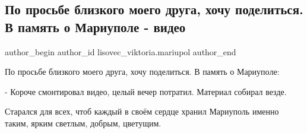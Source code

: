  
 
 
 
 

\subsection{По просьбе близкого моего друга, хочу поделиться. В память о Мариуполе - видео}
\label{sec:07_02_2023.fb.lisovec_viktoria.mariupol.1.po_prosbe_blizkogo_m}

\ifcmt
 author_begin
   author_id lisovec_viktoria.mariupol
 author_end
\fi

По просьбе близкого моего друга, хочу поделиться. В память о Мариуполе:

- Короче смонтировал видео, целый вечер потратил.   Материал собирал везде.

Старался для всех, чтоб каждый в своём сердце хранил Мариуполь именно таким,
ярким  светлым, добрым, цветущим.

